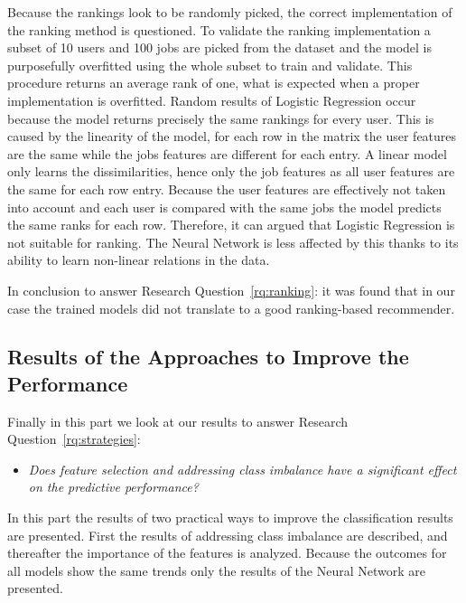 Because the rankings look to be randomly picked, the correct implementation of the ranking method is questioned. 
To validate the ranking implementation a subset of 10 users and 100 jobs are picked from the dataset and the model is purposefully overfitted using the whole subset to train and validate.
This procedure returns an average rank of one, what is expected when a proper implementation is overfitted.
Random results of Logistic Regression occur because the model returns precisely the same rankings for every user.
This is caused by the linearity of the model, for each row in the matrix the user features are the same while the jobs features are different for each entry.
A linear model only learns the dissimilarities, hence only the job features as all user features are the same for each row entry. 
Because the user features are effectively not taken into account and each user is compared with the same jobs the model predicts the same ranks for each row.
Therefore, it can argued that Logistic Regression is not suitable for ranking.
The Neural Network is less affected by this thanks to its ability to learn non-linear relations in the data. 

In conclusion to answer Research Question~\ref{rq:ranking}: it was found that in our case the trained models did not translate to a good ranking-based recommender.

\subsection{Results of the Approaches to Improve the Performance}
\label{ssec:ir}

Finally in this part we look at our results to answer Research Question~\ref{rq:strategies}:
\begin{itemize}
	\item[] \em Does feature selection and addressing class imbalance have a significant effect on the predictive performance?
\end{itemize}

\noindent In this part the results of two practical ways to improve the classification results are presented. 
First the results of addressing class imbalance are described, and thereafter the importance of the features is analyzed. 
Because the outcomes for all models show the same trends only the results of the Neural Network are presented.

